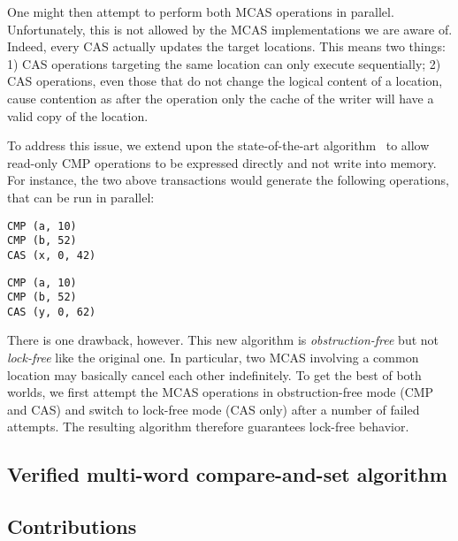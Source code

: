 One might then attempt to perform both MCAS operations in parallel.
Unfortunately, this is not allowed by the MCAS implementations we are aware of.
Indeed, every CAS actually updates the target locations.
This means two things: 1) CAS operations targeting the same location can only execute sequentially; 2) CAS operations, even those that do not change the logical content of a location, cause contention as after the operation only the cache of the writer will have a valid copy of the location.

To address this issue, we extend upon the state-of-the-art algorithm~\cite{DBLP:conf/wdag/GuerraouiKMZ20} to allow read-only CMP operations to be expressed directly and not write into memory.
For instance, the two above transactions would generate the following operations, that can be run in parallel:

\medskip
\begin{minipage}[t]{.45\textwidth}
\begin{verbatim}
CMP (a, 10)
CMP (b, 52)
CAS (x, 0, 42)
\end{verbatim}
\end{minipage}
\hfill
\begin{minipage}[t]{.45\textwidth}
\begin{verbatim}
CMP (a, 10)
CMP (b, 52)
CAS (y, 0, 62)
\end{verbatim}
\end{minipage}
\medskip

There is one drawback, however.
This new algorithm is \emph{obstruction-free} but not \emph{lock-free} like the original one.
In particular, two MCAS involving a common location may basically cancel each other indefinitely.
To get the best of both worlds, we first attempt the MCAS operations in obstruction-free mode (CMP and CAS) and switch to lock-free mode (CAS only) after a number of failed attempts.
The resulting algorithm therefore guarantees lock-free behavior.

\subsection{Verified multi-word compare-and-set algorithm}



\subsection{Contributions}




